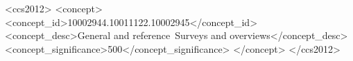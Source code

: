 
\begin{CCSXML}
	<ccs2012>
	<concept>
		<concept_id>10002944.10011122.10002945</concept_id>
		<concept_desc>General and reference~Surveys and overviews</concept_desc>
		<concept_significance>500</concept_significance>
	</concept>
	</ccs2012>
\end{CCSXML}


